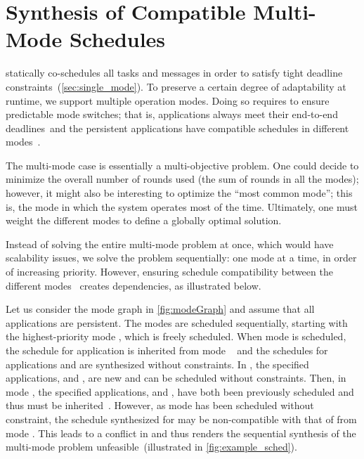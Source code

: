 
\section{Synthesis of Compatible Multi-Mode Schedules}
\label{sec:multi_mode}


\TTW statically co-schedules all tasks and messages in order to satisfy tight deadline constraints~(\cref{sec:single_mode}).
To preserve a certain degree of adaptability at runtime, we support multiple operation modes.
Doing so requires to ensure predictable mode switches; that is, applications always meet their end-to-end deadlines~\objA and the persistent applications have compatible schedules in different modes~\objB.


The multi-mode case is essentially a multi-objective problem. One could decide to minimize the overall number of rounds used (\ie the sum of rounds in all the modes); however, it might also be interesting to optimize the ``most common mode''; this is, the mode in which the system operates most of the time.
Ultimately, one must weight the different modes to define a globally optimal solution.

Instead of solving the entire multi-mode problem at once, which would have scalability issues, we solve the problem sequentially: one mode at a time, in order of increasing priority.
However, ensuring schedule compatibility between the different modes~ creates dependencies, as illustrated below.

\begin{example}
\label{exp:sched_conflict_basic}
	Let us consider the mode graph in \cref{fig:modeGraph} and assume that all applications are persistent.
	The modes are scheduled sequentially, starting with the highest-priority mode , which is freely scheduled.
	When mode  is scheduled, the schedule for application  is inherited from mode ~ and the schedules for applications  and  are synthesized without constraints.
	In , the specified applications,  and , are new and can be scheduled without constraints.
	Then, in mode , the specified applications,  and , have both been previously scheduled and thus must be inherited~.
	However, as mode  has been scheduled without constraint, the schedule synthesized for  may be non-compatible with that of  from mode . This leads to a conflict in  and thus renders the sequential synthesis of the multi-mode problem unfeasible~(illustrated in \cref{fig:example_sched}).
\end{example}

